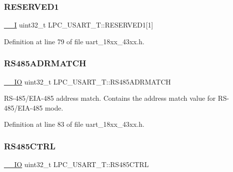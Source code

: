 \subsubsection{\texorpdfstring{R\+E\+S\+E\+R\+V\+E\+D1}{RESERVED1}}
{\footnotesize\ttfamily \hyperlink{core__sc300_8h_af63697ed9952cc71e1225efe205f6cd3}{\+\_\+\+\_\+I} uint32\+\_\+t L\+P\+C\+\_\+\+U\+S\+A\+R\+T\+\_\+\+T\+::\+R\+E\+S\+E\+R\+V\+E\+D1\mbox{[}1\mbox{]}}



Definition at line 79 of file uart\+\_\+18xx\+\_\+43xx.\+h.

\mbox{\label{struct_l_p_c___u_s_a_r_t___t_adfc2810503e8eb5f4d9bc4622500295e}} 
\subsubsection{\texorpdfstring{R\+S485\+A\+D\+R\+M\+A\+T\+CH}{RS485ADRMATCH}}
{\footnotesize\ttfamily \hyperlink{core__sc300_8h_aec43007d9998a0a0e01faede4133d6be}{\+\_\+\+\_\+\+IO} uint32\+\_\+t L\+P\+C\+\_\+\+U\+S\+A\+R\+T\+\_\+\+T\+::\+R\+S485\+A\+D\+R\+M\+A\+T\+CH}

R\+S-\/485/\+E\+I\+A-\/485 address match. Contains the address match value for R\+S-\/485/\+E\+I\+A-\/485 mode. 

Definition at line 83 of file uart\+\_\+18xx\+\_\+43xx.\+h.

\mbox{\label{struct_l_p_c___u_s_a_r_t___t_a6a7e49f50f49efbe8e11befcf6e7d6b4}} 
\subsubsection{\texorpdfstring{R\+S485\+C\+T\+RL}{RS485CTRL}}
{\footnotesize\ttfamily \hyperlink{core__sc300_8h_aec43007d9998a0a0e01faede4133d6be}{\+\_\+\+\_\+\+IO} uint32\+\_\+t L\+P\+C\+\_\+\+U\+S\+A\+R\+T\+\_\+\+T\+::\+R\+S485\+C\+T\+RL}

